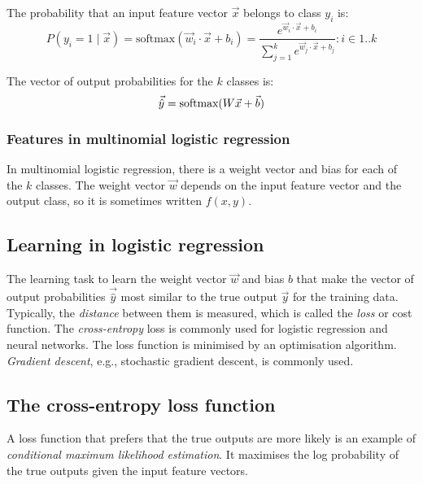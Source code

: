 The probability that an input feature vector $\vec{x}$ belongs to class $y_i$ is:
\begin{equation}
  \label{eqnSoftmax1}
  P(y_i = 1 \mid \vec{x})
  = \text{softmax}(\vec{w}_i \cdot \vec{x} + b_i)
  = \frac{e^{\vec{w}_i \cdot \vec{x} + b_i}}{\sum_{j = 1}^{k} e^{\vec{w}_j \cdot \vec{x} + b_j}}
  : i \in 1 .. k
\end{equation}

The vector of output probabilities for the $k$ classes is:
\begin{equation}
  \label{eqnSoftmax2}
  \vec{\hat{y}} = \text{softmax}(W \vec{x} + \vec{b})
\end{equation}

\subsubsection{Features in multinomial logistic regression}

In multinomial logistic regression, there is a weight vector and bias for each
of the $k$ classes.
The weight vector $\vec{w}$ depends on the input feature vector and the output
class, so it is sometimes written $f(x, y)$.

\subsection{Learning in logistic regression}

The learning task to learn the weight vector $\vec{w}$ and bias $b$ that make
the vector of output probabilities $\vec{\hat{y}}$ most similar to the true
output $\vec{y}$ for the training data.
Typically, the \textit{distance} between them is measured, which is called the
\textit{loss} or cost function.
The \textit{cross-entropy} loss is commonly used for logistic regression and
neural networks.
The loss function is minimised by an optimisation algorithm.
\textit{Gradient descent}, e.g., stochastic gradient descent, is commonly used.

\subsection{The cross-entropy loss function}

A loss function that prefers that the true outputs are more likely is an
example of \textit{conditional maximum likelihood estimation}.
It maximises the log probability of the true outputs given the input feature
vectors.

